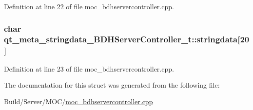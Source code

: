 Definition at line 22 of file moc\+\_\+bdhservercontroller.\+cpp.

\hypertarget{structqt__meta__stringdata___b_d_h_server_controller__t_aa38bafff78dcda3722599e50d7d6721a}{}
\subsubsection[{stringdata}]{\setlength{\rightskip}{0pt plus 5cm}char qt\+\_\+meta\+\_\+stringdata\+\_\+\+B\+D\+H\+Server\+Controller\+\_\+t\+::stringdata\mbox{[}20\mbox{]}}\label{structqt__meta__stringdata___b_d_h_server_controller__t_aa38bafff78dcda3722599e50d7d6721a}


Definition at line 23 of file moc\+\_\+bdhservercontroller.\+cpp.



The documentation for this struct was generated from the following file\+:\begin{DoxyCompactItemize}
\item 
Build/\+Server/\+M\+O\+C/\hyperlink{moc__bdhservercontroller_8cpp}{moc\+\_\+bdhservercontroller.\+cpp}\end{DoxyCompactItemize}
